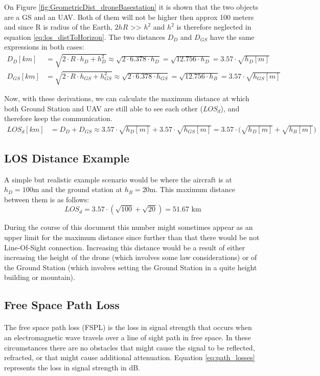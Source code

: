 On Figure \ref{fig:GeometricDist_droneBasestation} it is shown that the two objects are a GS and an UAV. Both of them will not be higher then approx 100 meters and since R is radius of the Earth, $2hR$ >> $h^2$ and $h^2$ is therefore neglected in equation \ref{eq:los_distToHorizon}. The two distances $D_D$ and $D_{GS}$ have the same expressions in both cases:
\begin{align*}
	D_D [km] &= \sqrt{2\cdot R \cdot h_D + h_{D}^2} \approx \sqrt{2\cdot 6.378\cdot h_D} = \sqrt{12.756\cdot h_D} = 3.57\cdot \sqrt{h_D[m]} \\
	D_{GS} [km] &= \sqrt{2\cdot R \cdot h_{GS} + h_{GS}^2} \approx \sqrt{2\cdot 6.378\cdot h_{GS}} = \sqrt{12.756\cdot h_B} = 3.57\cdot \sqrt{h_{GS}[m]}
\end{align*}

Now, with these derivations, we can calculate the maximum distance at which both Ground Station and UAV are still able to see each other ($LOS_{d}$), and therefore keep the communication.
\begin{align}
	LOS_d[km]	 &= D_D + D_{GS} \approx 3.57\cdot \sqrt{h_D[m]} + 3.57\cdot \sqrt{h_{GS}[m]} = {3.57\cdot (\sqrt{h_D[m]} + \sqrt{h_B[m]}} )
\end{align}

\subsection*{LOS Distance Example}
A simple but realistic example scenario would be where the aircraft is at $h_D = 100$m and the ground station at $h_B = 20$m. This maximum distance between them is as follows:
\begin{equation*}
	LOS_d = 3.57\cdot (\sqrt{100} + \sqrt{20}) = 51.67 \text{ km}
\end{equation*}

During the course of this document this number might sometimes appear as an upper limit for the maximum distance since further than that there would be not Line-Of-Sight connection. Increasing this distance would be a result of either increasing the height of the drone (which involves some law considerations) or of the Ground Station (which involves setting the Ground Station in a quite height building or mountain).

\subsection{Free Space Path Loss}\label{subsec:path_loss}
\paragraph{}
The free space path loss (FSPL) is the loss in signal strength that occurs when an electromagnetic wave travels over a line of sight path in free space. In these circumstances there are no obstacles that might cause the signal to be reflected, refracted, or that might cause additional attenuation. Equation \ref{eq:path_losses} represents the loss in signal strength in dB.

